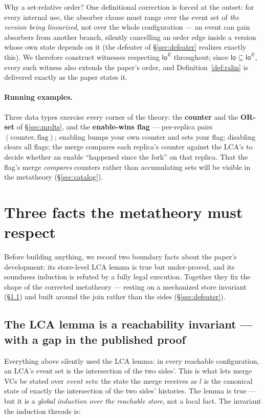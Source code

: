 \documentclass[11pt]{article}
\newcommand{\loE}[1]{\mathsf{lo}^{#1}}
\begin{document}
Why a set-relative order? One definitional correction is forced at the
outset: for every internal use, the absorber clause must range over the
event set of \emph{the version being linearized}, not over the whole
configuration --- an event can gain absorbers from another branch,
silently cancelling an order edge inside a version whose own state
depends on it (the defeater of \S\ref{sec:defeater} realizes exactly
this). We therefore construct witnesses respecting $\loE{E}$ throughout;
since $\mathsf{lo} \subseteq \loE{E}$, every such witness also extends
the paper's order, and Definition~\ref{def:ralin} is delivered exactly
as the paper states it.

\paragraph{Running examples.} Three data types exercise every corner of
the theory: the \textbf{counter} and the \textbf{OR-set} of
\S\ref{sec:mrdts}, and the \textbf{enable-wins flag} --- per-replica
pairs $(\text{counter},\text{flag})$; enabling bumps your own counter and
sets your flag; disabling clears all flags; the merge compares each
replica's counter against the LCA's to decide whether an enable
``happened since the fork'' on that replica. That the flag's merge
\emph{compares} counters rather than accumulating sets will be visible in
the metatheory (\S\ref{sec:catalog}).

\section{Three facts the metatheory must respect}

Before building anything, we record two boundary facts about the
paper's development: its store-level LCA lemma is true but under-proved,
and its soundness induction is refuted by a fully legal execution.
Together they fix the shape of the corrected metatheory --- resting on a
mechanized store invariant (\S\ref{sec:lca}) and built around the join
rather than the sides (\S\ref{sec:defeater}).

\subsection{The LCA lemma is a reachability invariant --- with a gap in the
published proof}
\label{sec:lca}

Everything above silently used the LCA lemma: in every reachable
configuration, an LCA's event set is the intersection of the two sides'.
This is what lets merge VCs be stated over \emph{event sets}: the state
the merge receives as $l$ is the canonical state of exactly the
intersection of the two sides' histories. The lemma is true --- but it
is a \emph{global induction over the reachable store}, not a local
fact. The invariant the induction threads is:
\end{document}
